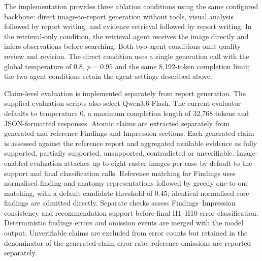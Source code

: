 The implementation provides three ablation conditions using the same configured backbone: direct image-to-report generation without tools, visual analysis followed by report writing, and evidence retrieval followed by report writing. In the retrieval-only condition, the retrieval agent receives the image directly and infers observations before searching. Both two-agent conditions omit quality review and revision. The direct condition uses a single generation call with the global temperature of 0.8, $p=0.95$ and the same 8,192-token completion limit; the two-agent conditions retain the agent settings described above.

Claim-level evaluation is implemented separately from report generation. The supplied evaluation scripts also select Qwen3.6-Flash. The current evaluator defaults to temperature 0, a maximum completion length of 32,768 tokens and JSON-formatted responses. Atomic claims are extracted separately from generated and reference Findings and Impression sections. Each generated claim is assessed against the reference report and aggregated available evidence as fully supported, partially supported, unsupported, contradicted or unverifiable. Image-enabled evaluation attaches up to eight raster images per case by default to the support and final classification calls. Reference matching for Findings uses normalised finding and anatomy representations followed by greedy one-to-one matching, with a default candidate threshold of 0.45; identical normalised core findings are admitted directly. Separate checks assess Findings--Impression consistency and recommendation support before final H1--H10 error classification. Deterministic findings errors and omission events are merged with the model output. Unverifiable claims are excluded from error counts but retained in the denominator of the generated-claim error rate; reference omissions are reported separately.
